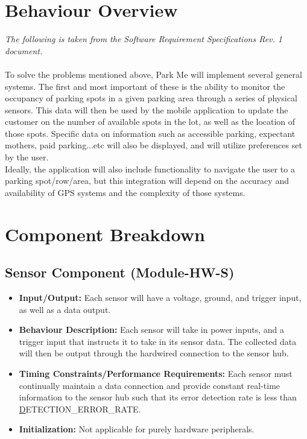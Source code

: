 \documentclass[]{article}
\begin{document}
	\section{Behaviour Overview}
	\textit{The following is taken from the Software Requirement Specifications Rev. 1 document.}\\\\
	To solve the problems mentioned above, Park Me will implement several general systems. The first and most important of these is the ability to monitor the occupancy of parking spots in a given parking area through a series of physical sensors. This data will then be used by the mobile application to update the customer on the number of available spots in the lot, as well as the location of those spots. Specific data on information such as accessible parking, expectant mothers, paid parking...etc will also be displayed, and will utilize preferences set by the user.  \\
	
	Ideally, the application will also include functionality to navigate the user to a parking spot/row/area, but this integration will depend on the accuracy and availability of GPS systems and the complexity of those systems.
	
	
	\section{Component Breakdown}
	\subsection{Sensor Component (Module-HW-S)}
	\begin{itemize}
		\item \textbf{Input/Output:} Each sensor will have a voltage, ground, and trigger input, as well as a data output.
		\item \textbf{Behaviour Description:} Each sensor will take in power inputs, and a trigger input that instructs it to take in its sensor data. The collected data will then be output through the hardwired connection to the sensor hub.
		\item \textbf{Timing Constraints/Performance Requirements:} Each sensor must continually maintain a data connection and provide constant real-time information to the sensor hub such that its error detection rate is less than \hyperlink{DETERR}DETECTION\_ERROR\_RATE.
		\item \textbf{Initialization:} Not applicable for purely hardware peripherals.
	\end{itemize}
	
\end{document}
